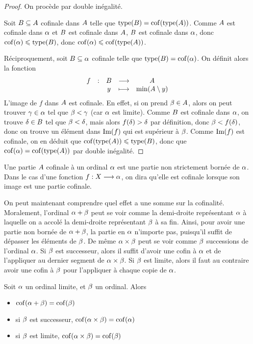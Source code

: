 \begin{proof}
  On procède par double inégalité.

  Soit $B\subseteq A$ cofinale dans $A$ telle que
  $\operatorname{type}(B) = \operatorname{cof}(\operatorname{type}(A))$. Comme $A$ est cofinale dans
  $\alpha$ et $B$ est cofinale dans $A$, $B$ est cofinale dans
  $\alpha$, donc $\operatorname{cof}(\alpha) \leqslant \operatorname{type}(B)$, donc
  $\operatorname{cof}(\alpha) \leqslant \operatorname{cof}(\operatorname{type}(A))$.

  Réciproquement, soit $B\subseteq \alpha$ cofinale telle que
  $\operatorname{type}(B) = \operatorname{cof}(\alpha)$. On définit alors la fonction
  \[\makeFun{f}{\varPtB}{\varPt}{y}{\min (\varPt \setminus y)}\]
  L'image de $f$ dans $A$ est cofinale. En effet, si on prend
  $\beta \in A$, alors on peut trouver $\gamma \in \alpha$ tel que
  $\beta < \gamma$ (car $\alpha$ est limite). Comme $B$ est cofinale dans
  $\alpha$, on trouve $\delta \in B$ tel que $\beta < \delta$, mais alors
  $f(\delta) > \delta$ par définition, donc $\beta < f(\delta)$, donc on trouve
  un élément dans $\operatorname{Im}(f)$ qui est supérieur à $\beta$. Comme $\operatorname{Im}(f)$ est
  cofinale, on en déduit que $\operatorname{cof}(\operatorname{type}(A)) \leqslant \operatorname{type}(B)$, donc que
  $\operatorname{cof}(\alpha) = \operatorname{cof}(\operatorname{type}(A))$ par double inégalité.
\end{proof}

\begin{notation}
  Une partie $A$ cofinale à un ordinal $\alpha$ est une partie non
  strictement bornée de $\alpha$. Dans le cas d'une fonction
  $f : \displaystyle X \longrightarrow \alpha$, on dira qu'elle est cofinale lorsque son
  image est une partie cofinale.
\end{notation}

On peut maintenant comprendre quel effet a une somme sur la cofinalité.
Moralement, l'ordinal $\alpha+\beta$ peut se voir comme la demi-droite
représentant $\alpha$ à laquelle on a accolé la demi-droite représentant
$\beta$ à sa fin. Ainsi, pour avoir une partie non bornée de $\alpha + \beta$,
la partie en $\alpha$ n'importe pas, puisqu'il suffit de dépasser les éléments
de $\beta$. De même $\alpha \times \beta$ peut se voir comme $\beta$
successions de l'ordinal $\alpha$. Si $\beta$ est successeur, alors il suffit
d'avoir une cofin à $\alpha$ et de l'appliquer au dernier segment de
$\alpha\times\beta$. Si $\beta$ est limite, alors il faut au contraire avoir
une cofin à $\beta$ pour l'appliquer à chaque copie de $\alpha$.

\begin{proposition}\label{prop.cof.oper}
  Soit $\alpha$ un ordinal limite, et $\beta$ un ordinal. Alors
  \begin{itemize}
  \item $\operatorname{cof}(\alpha + \beta) = \operatorname{cof}(\beta)$
  \item si $\beta$ est successeur, $\operatorname{cof}(\alpha \times \beta) = \operatorname{cof}(\alpha)$
  \item si $\beta$ est limite, $\operatorname{cof}(\alpha\times\beta) = \operatorname{cof}(\beta)$
  \end{itemize}
\end{proposition}

